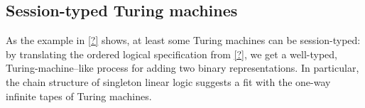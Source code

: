 


\subsection{Session-typed Turing machines}

As the example in \cref{?} shows, at least some Turing machines can be session-typed: by translating the ordered logical specification from \cref{?}, we get a well-typed, Turing-machine--like process for adding two binary representations.
In particular, the chain structure of singleton linear logic suggests a fit with the one-way infinite tapes of Turing machines.


